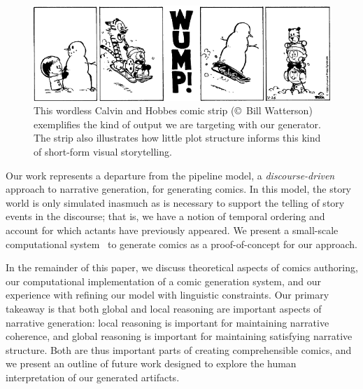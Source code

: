 \begin{figure}
\includegraphics[width=\columnwidth]{calvin-and-hobbes.png}
\caption{
This wordless Calvin and Hobbes comic strip ({\small \copyright}~Bill Watterson)
exemplifies the kind of output we are targeting with our generator. The strip also
illustrates how little plot structure informs this kind of short-form visual
storytelling.
}
\label{fig:calvin}
\end{figure}

Our work represents a departure from the pipeline model, a
\emph{discourse-driven} approach to narrative generation, for generating
comics. In this model, the story world is only simulated inasmuch as is
necessary to support the telling of story events in the discourse; that is,
we have a notion of temporal ordering and account for which actants have
previously appeared. We present a small-scale computational
system~\cite{montfort2012small} to generate comics as a proof-of-concept
for our approach.

In the remainder of this paper, we discuss theoretical aspects of comics
authoring, our computational implementation of a comic generation system,
and our experience with refining our model with linguistic constraints. Our
primary takeaway is that both global and local reasoning are important
aspects of narrative generation: local reasoning is important for
maintaining narrative coherence, and global reasoning is important for
maintaining satisfying narrative structure. Both are thus important parts
of creating comprehensible comics, and we present an outline of future work
designed to explore the human interpretation of our generated artifacts.

